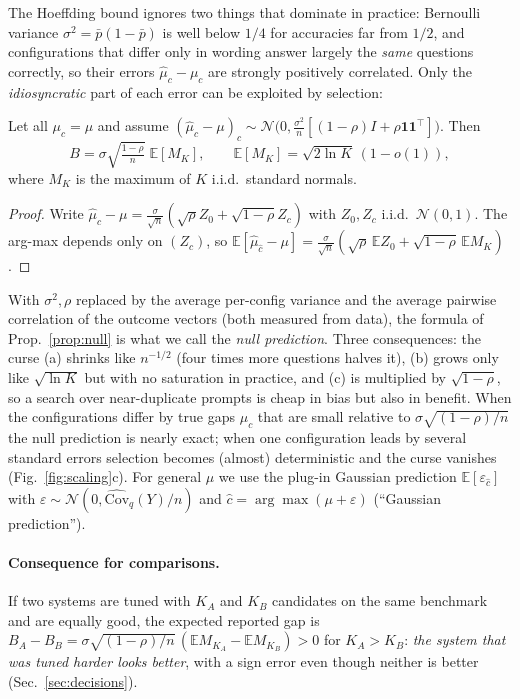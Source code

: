 The Hoeffding bound ignores two things that dominate in practice: Bernoulli variance $\sigma^2=\bar p(1-\bar p)$ is well below $1/4$ for accuracies far from $1/2$, and configurations that differ only in wording answer largely the \emph{same} questions correctly, so their errors $\hat\mu_c-\mu_c$ are strongly positively correlated.
Only the \emph{idiosyncratic} part of each error can be exploited by selection:

\begin{proposition}\label{prop:null}
Let all $\mu_c=\mu$ and assume $(\hat\mu_c-\mu)_c\sim\mathcal N\big(0,\tfrac{\sigma^2}{n}[(1-\rho)I+\rho\mathbf 1\mathbf 1^\top]\big)$.
Then
\begin{equation}
B=\sigma\sqrt{\tfrac{1-\rho}{n}}\;\mathbb E[M_K],\qquad \mathbb E[M_K]=\sqrt{2\ln K}\,(1-o(1)),
\end{equation}
where $M_K$ is the maximum of $K$ i.i.d.\ standard normals.
\end{proposition}
\begin{proof}
Write $\hat\mu_c-\mu=\frac{\sigma}{\sqrt n}(\sqrt\rho Z_0+\sqrt{1-\rho}Z_c)$ with $Z_0,Z_c$ i.i.d.\ $\mathcal N(0,1)$. The arg-max depends only on $(Z_c)$, so $\mathbb E[\hat\mu_{\hat c}-\mu]=\frac{\sigma}{\sqrt n}(\sqrt\rho\,\mathbb EZ_0+\sqrt{1-\rho}\,\mathbb EM_K)$.
\end{proof}
With $\sigma^2,\rho$ replaced by the average per-config variance and the average pairwise correlation of the outcome vectors (both measured from data), the formula of Prop.~\ref{prop:null} is what we call the \emph{null prediction}.
Three consequences: the curse (a) shrinks like $n^{-1/2}$ (four times more questions halves it), (b) grows only like $\sqrt{\ln K}$ but with no saturation in practice, and (c) is multiplied by $\sqrt{1-\rho}$, so a search over near-duplicate prompts is cheap in bias but also in benefit.
When the configurations differ by true gaps $\mu_c$ that are small relative to $\sigma\sqrt{(1-\rho)/n}$ the null prediction is nearly exact; when one configuration leads by several standard errors selection becomes (almost) deterministic and the curse vanishes (Fig.~\ref{fig:scaling}c).
For general $\mu$ we use the plug-in Gaussian prediction $\mathbb E[\varepsilon_{\hat c}]$ with $\varepsilon\sim\mathcal N(0,\widehat{\mathrm{Cov}}_q(Y)/n)$ and $\hat c=\arg\max(\mu+\varepsilon)$ (``Gaussian prediction'').

\paragraph{Consequence for comparisons.}
If two systems are tuned with $K_A$ and $K_B$ candidates on the same benchmark and are equally good, the expected reported gap is $B_A-B_B=\sigma\sqrt{(1-\rho)/n}\,(\mathbb EM_{K_A}-\mathbb EM_{K_B})>0$ for $K_A>K_B$: \emph{the system that was tuned harder looks better}, with a sign error even though neither is better (Sec.~\ref{sec:decisions}).


